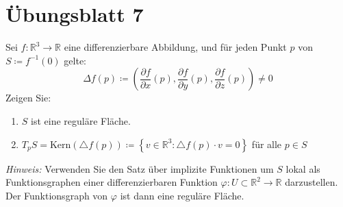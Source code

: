 \section{Übungsblatt 7}
\setcounter{problemcounter}{0}

\begin{assignment}
  Sei \( f: \mathbb{R}^3 \to \mathbb{R} \) eine differenzierbare Abbildung, und für jeden Punkt \( p \) von \( S \coloneqq f^{ -1 }(0) \) gelte:
  \begin{equation*}
   \Delta f(p) \coloneqq \left(\frac{\partial f}{\partial x}(p), 
    \frac{\partial f}{\partial y}(p), 
    \frac{\partial f}{\partial z}(p) \right) \neq 0
  \end{equation*}
  Zeigen Sie: 
  \begin{enumerate}[label= (\alph*)] 
    \item \( S \) ist eine reguläre Fläche.
    \item \( T_p S = \text{Kern}(\triangle f(p)) \coloneqq \left \{ v \in \mathbb{R}^3 : \triangle f(p) \cdot v = 0 \right \} \) für alle \( p \in S \) 
  \end{enumerate}
  \emph{Hinweis:} Verwenden Sie den Satz über implizite Funktionen um \( S \) lokal als Funktionsgraphen einer differenzierbaren Funktion \( \varphi : U \subset \mathbb{R}^2 \to \mathbb{R} \) darzustellen. Der Funktionsgraph von \( \varphi \) ist dann eine reguläre Fläche.
\end{assignment}
